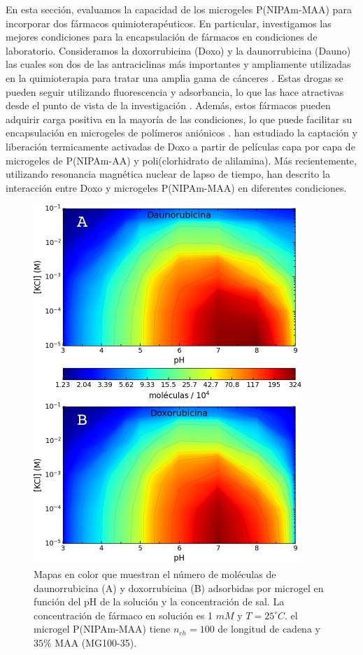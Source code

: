 En esta secci\'on, evaluamos la capacidad de los microgeles P(NIPAm-MAA) para incorporar dos f\'armacos quimioterap\'euticos. En particular, investigamos las mejores condiciones para la encapsulaci\'on de f\'armacos en condiciones de laboratorio. Consideramos la doxorrubicina (Doxo) y la daunorrubicina (Dauno) las cuales son dos de las antraciclinas m\'as importantes y ampliamente utilizadas en la quimioterapia para tratar una amplia gama de c\'anceres \cite{Panis2012, carvalho2009, aubel1984daunorubicin,come1999dual}. Estas drogas se pueden seguir utilizando fluorescencia y adsorbancia, lo que las hace atractivas desde el punto de vista de la investigaci\'on \cite{Serpe2005, ThanHtun2009, PerezChavez2020}. Adem\'as, estos f\'armacos pueden adquirir carga positiva en la mayor\'ia de las condiciones, lo que puede facilitar su encapsulaci\'on en microgeles de pol\'imeros ani\'onicos \cite{li2019}. \citet{Serpe2005} han estudiado la captaci\'on y liberaci\'on termicamente activadas de Doxo a partir de pel\'iculas capa por capa de microgeles de P(NIPAm-AA) y poli(clorhidrato de alilamina). M\'as recientemente, utilizando resonancia magn\'etica nuclear de lapso de tiempo, \citet{MartinezMoro2020} han descrito la interacci\'on entre Doxo y microgeles P(NIPAm-MAA) en diferentes condiciones.
\begin{figure}[!tb]
	\centering
	\includegraphics[width=0.5\linewidth]{Figures/graph-gel/drug_ads.pdf}
	\caption{Mapas en color que muestran el n\'umero de mol\'eculas de daunorrubicina (A) y doxorrubicina (B) adsorbidas por microgel en funci\'on del pH de la soluci\'on y la concentraci\'on de sal.
		La concentraci\'on de f\'armaco en soluci\'on es 1 $mM$ y $T=25 ^\circ C$.
		el microgel P(NIPAm-MAA) tiene $n_{ch}=100$ de longitud de cadena y $35\%$ MAA (MG100-35).}
	\label{fig:gel:drug_ads}
\end{figure}


